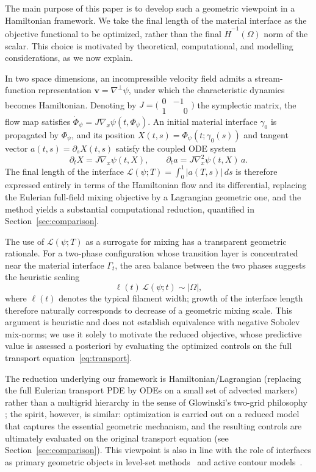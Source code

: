 \documentclass[12pt, reqno]{amsart}
\theoremstyle{plain}
\theoremstyle{definition}
\numberwithin{equation}{section}
\numberwithin{figure}{section}
\numberwithin{algorithm}{section}
\begin{document}
The main purpose of this paper is to develop such a geometric viewpoint in a Hamiltonian framework. We take the final length of the material interface as the objective functional to be optimized, rather than the final $\dot{H}^{-1}(\Omega)$ norm of the scalar. This choice is motivated by theoretical, computational, and modelling considerations, as we now explain.

In two space dimensions, an incompressible velocity field admits a stream-function representation $\mathbf v=\nabla^\perp \psi$, under which the characteristic dynamics becomes Hamiltonian. Denoting by $J=\bigl(\begin{smallmatrix}0&-1\\1&\phantom{-}0\end{smallmatrix}\bigr)$ the symplectic matrix, the flow map satisfies $\dot\Phi_\psi=J\nabla_x \psi(t,\Phi_\psi)$. An initial material interface $\gamma_0$ is propagated by $\Phi_\psi$, and its position $X(t,s)=\Phi_\psi(t;\gamma_0(s))$ and tangent vector $a(t,s)=\partial_s X(t,s)$ satisfy the coupled ODE system
\[
\partial_t X = J\nabla_x \psi(t,X),
\qquad
\partial_t a = J\nabla_x^2 \psi(t,X)\,a.
\]
The final length of the interface $\mathcal{L}(\psi;T)=\int_0^1|a(T,s)|\,ds$ is therefore expressed entirely in terms of the Hamiltonian flow and its differential, replacing the Eulerian full-field mixing objective by a Lagrangian geometric one, and the method yields a substantial computational reduction, quantified in Section~\ref{sec:comparison}.

The use of $\mathcal L(\psi;T)$ as a surrogate for mixing has a transparent geometric rationale. For a two-phase configuration whose transition layer is concentrated near the material interface $\Gamma_t$, the area balance between the two phases suggests the heuristic scaling
\begin{equation}\label{eq:geom_scale}
\ell(t)\,\mathcal L(\psi;t)\sim|\Omega|,
\end{equation}
where $\ell(t)$ denotes the typical filament width; growth of the interface length therefore naturally corresponds to decrease of a geometric mixing scale. This argument is heuristic and does not establish equivalence with negative Sobolev mix-norms; we use it solely to motivate the reduced objective, whose predictive value is assessed a posteriori by evaluating the optimized controls on the full transport equation~\eqref{eq:transport}.

The reduction underlying our framework is Hamiltonian/Lagrangian (replacing the full Eulerian transport PDE by ODEs on a small set of advected markers) rather than a multigrid hierarchy in the sense of Glowinski's two-grid philosophy \cite{Glowinski1992}; the spirit, however, is similar: optimization is carried out on a reduced model that captures the essential geometric mechanism, and the resulting controls are ultimately evaluated on the original transport equation (see Section~\ref{sec:comparison}). This viewpoint is also in line with the role of interfaces as primary geometric objects in level-set methods~\cite{OsherSethian1988} and active contour models~\cite{Caselles1997}.
\end{document}
